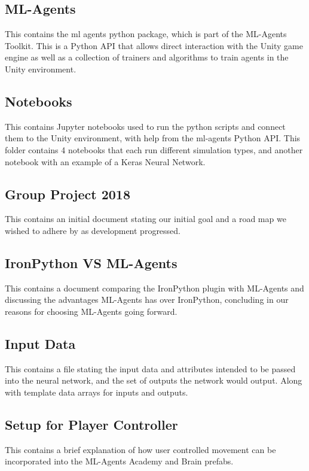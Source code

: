 \subsection{ML-Agents}
This contains the ml agents python package, which is part of the ML-Agents Toolkit. This is a Python API that allows direct interaction with the Unity game engine as well as a collection of trainers and algorithms to train agents in the Unity environment.


\subsection{Notebooks}
This contains Jupyter notebooks used to run the python scripts and connect them to the Unity environment, with help from the ml-agents Python API. This folder contains 4 notebooks that each run different simulation types, and another notebook with an example of a Keras Neural Network. 


\subsection{Group Project 2018}
This contains an initial document stating our initial goal and a road map we wished to adhere by as development progressed.

\subsection{IronPython VS ML-Agents}
This contains a document comparing the IronPython plugin with ML-Agents and discussing the advantages ML-Agents has over IronPython, concluding in our reasons for choosing ML-Agents going forward.

\subsection{Input Data}
This contains a file stating the input data and attributes intended to be passed into the neural network, and the set of outputs the network would output. Along with template data arrays for inputs and outputs.


\subsection{Setup for Player Controller}
This contains a brief explanation of how user controlled movement can be incorporated into the ML-Agents Academy and Brain prefabs.

